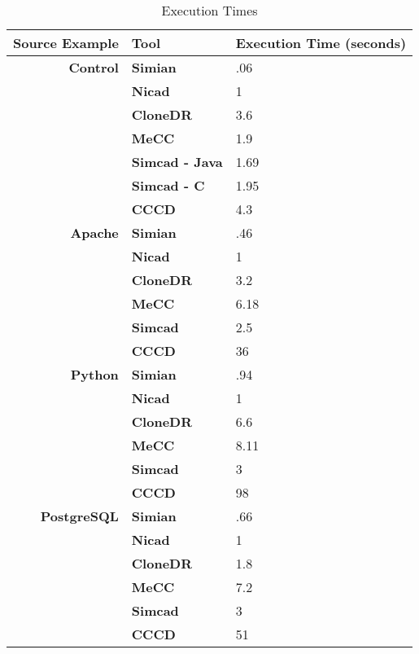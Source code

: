 \documentclass[smallextended]{svjour3}       %
\begin{document}
\begin{table}[thb!]

\begin{center}
\caption{Execution Times}
\label{table:executiontimes}
\begin{tabular}{r||l|l}
  \hline
\bfseries Source Example & \bfseries Tool & \bfseries Execution Time (seconds)  \\ \hline\hline
   \bfseries Control & \bfseries Simian & .06 \\ \cline{2-3}
  & \bfseries Nicad & 1 \\ \cline{2-3}
& \bfseries CloneDR & 3.6 \\ \cline{2-3}
& \bfseries MeCC & 1.9 \\ \cline{2-3}
& \bfseries Simcad - Java & 1.69 \\ \cline{2-3}
& \bfseries Simcad - C & 1.95 \\ \cline{2-3}
& \bfseries CCCD & 4.3 \\ \cline{2-3}
 \hline \hline

  \bfseries Apache & \bfseries Simian & .46\\ \cline{2-3}
  & \bfseries Nicad & 1 \\ \cline{2-3}
& \bfseries CloneDR & 3.2  \\ \cline{2-3}
& \bfseries MeCC & 6.18 \\ \cline{2-3}
& \bfseries Simcad & 2.5 \\ \cline{2-3}
& \bfseries CCCD & 36  \\ \cline{2-3}
 \hline

  \bfseries Python & \bfseries Simian & .94 \\ \cline{2-3}
  & \bfseries Nicad & 1 \\ \cline{2-3}
& \bfseries CloneDR & 6.6  \\ \cline{2-3}
& \bfseries MeCC & 8.11  \\ \cline{2-3}
& \bfseries Simcad & 3 \\ \cline{2-3}
& \bfseries CCCD & 98  \\ \cline{2-3}
 \hline  \hline

    \bfseries PostgreSQL & \bfseries Simian & .66 \\ \cline{2-3}
    & \bfseries Nicad & 1 \\ \cline{2-3}
& \bfseries CloneDR & 1.8 \\ \cline{2-3}
& \bfseries MeCC & 7.2 \\ \cline{2-3}
& \bfseries Simcad & 3 \\ \cline{2-3}
& \bfseries CCCD & 51 \\ \cline{2-3}
 \hline  \hline


\end{tabular}
\end{center}

\end{table}
\end{document}
